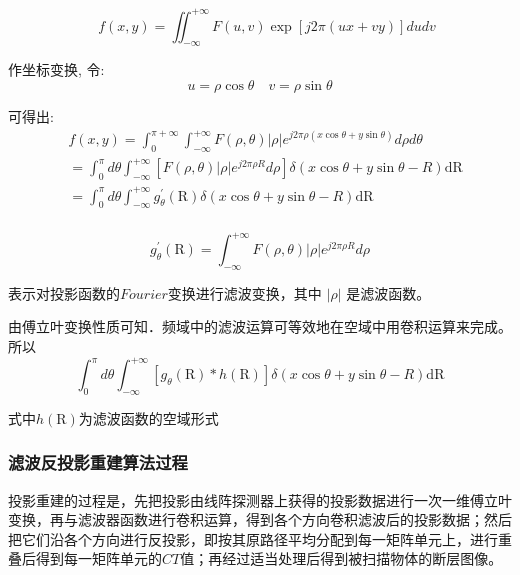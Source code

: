 \documentclass[hyperref]{ctexart}
\begin{document}
				\begin{equation}
					\quad f(x, y)=\iint_{-\infty}^{+\infty} F(u, v) \exp [j 2 \pi(u x+v y)] d u d v
				\end{equation}

				作坐标变换, 令: 
				\begin{equation}
					u=\rho \cos \theta \quad v=\rho \sin \theta
				\end{equation}

				可得出:
				\begin{equation}
					\begin{aligned}
					&f(x, y)=\int_{0}^{\pi+\infty} \int_{-\infty}^{+\infty} F(\rho, \theta)|\rho| e^{j 2 \pi \rho(x \cos \theta+y \sin \theta)} d \rho d \theta \\
					&=\int_{0}^{\pi} d \theta \int_{-\infty}^{+\infty}\left[F(\rho, \theta)|\rho| e^{j 2 \pi \rho R} d \rho\right] \delta(x \cos \theta+y \sin \theta-R) \mathrm{dR} \\
					&=\int_{0}^{\pi} d \theta \int_{-\infty}^{+\infty} g_{\theta}^{\prime}(\mathrm{R}) \delta(x \cos \theta+y \sin \theta-R) \mathrm{dR} \\				
					\end{aligned}
				\end{equation}

				\begin{equation}
					g_{\theta}^{\prime}(\mathrm{R})=\int_{-\infty}^{+\infty} F(\rho, \theta)|\rho| e^{j 2 \pi \rho R} d \rho
				\end{equation}

				表示对投影函数的$Fourier$变换进行滤波变换，其中 $|\rho|$ 是滤波函数。
	
				由傅立叶变换性质可知．频域中的滤波运算可等效地在空域中用卷积运算来完成。所以
				\begin{equation}
					\int_{0}^{\pi} d \theta \int_{-\infty}^{+\infty}[g_{\theta}(\mathrm{R})*h(\mathrm{R})]\delta(x \cos \theta+y \sin \theta-R) \mathrm{dR}
				\end{equation}

				式中$h(\mathrm{R})$为滤波函数的空域形式

			\subsubsection{滤波反投影重建算法过程}
				投影重建的过程是，先把投影由线阵探测器上获得的投影数据进行一次一维傅立叶变换，再与滤波器函数进行卷积运算，得到各个方向卷积滤波后的投影数据；然后把它们沿各个方向进行反投影，即按其原路径平均分配到每一矩阵单元上，进行重叠后得到每一矩阵单元的$CT$值；再经过适当处理后得到被扫描物体的断层图像。
				
\end{document}
